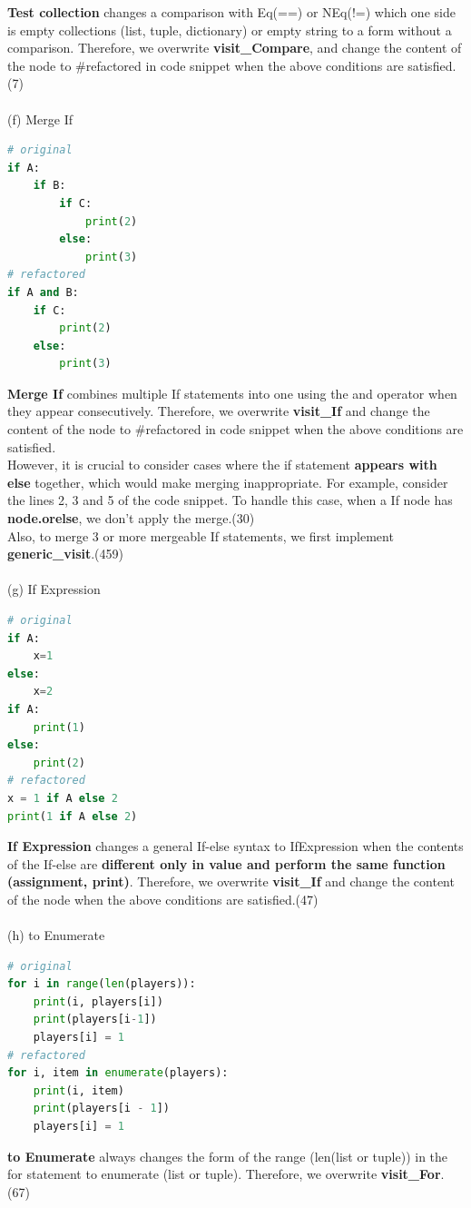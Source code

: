 \documentclass[11pt]{article}
\begin{document}
\textbf{Test collection} changes a comparison with Eq(==) or NEq(!=) which one side is empty collections (list, tuple, dictionary) or empty string to a form without a comparison. Therefore, we overwrite \textbf{visit\_Compare}, and change the content of the node to \#refactored in code snippet when the above conditions are satisfied.(7)\\ \\
(f) Merge If
\begin{lstlisting}[language=python]
# original
if A:
    if B:
		if C:
        	print(2)
		else:
			print(3)
# refactored
if A and B:
	if C:
    	print(2)
	else:
		print(3)
\end{lstlisting}
\textbf{Merge If} combines multiple If statements into one using the and operator when they appear consecutively. Therefore, we overwrite \textbf{visit\_If} and change the content of the node to \#refactored in code snippet when the above conditions are satisfied.\\
However, it is crucial to consider cases where the if statement \textbf{appears with else} together, which would make merging inappropriate. For example, consider the lines 2, 3 and 5 of the code snippet. To handle this case, when a If node has \textbf{node.orelse}, we don't apply the merge.(30)\\
Also, to merge 3 or more mergeable If statements, we first implement \textbf{generic\_visit}.(459)\\ \\
(g) If Expression
\begin{lstlisting}[language=python]
# original
if A:
    x=1
else:
    x=2
if A:
    print(1)
else:
    print(2)
# refactored
x = 1 if A else 2
print(1 if A else 2)
\end{lstlisting}
\textbf{If Expression} changes a general If-else syntax to IfExpression when the contents of the If-else are \textbf{different only in value and perform the same function (assignment, print)}. Therefore, we overwrite \textbf{visit\_If} and change the content of the node when the above conditions are satisfied.(47)\\ \\
(h) to Enumerate
\begin{lstlisting}[language=python]
# original
for i in range(len(players)):
    print(i, players[i])
    print(players[i-1])
    players[i] = 1
# refactored
for i, item in enumerate(players):
    print(i, item)
    print(players[i - 1])
    players[i] = 1
\end{lstlisting}
\textbf{to Enumerate} always changes the form of the range (len(list or tuple)) in the for statement to enumerate (list or tuple). Therefore, we overwrite \textbf{visit\_For}.(67)\\
\end{document}
